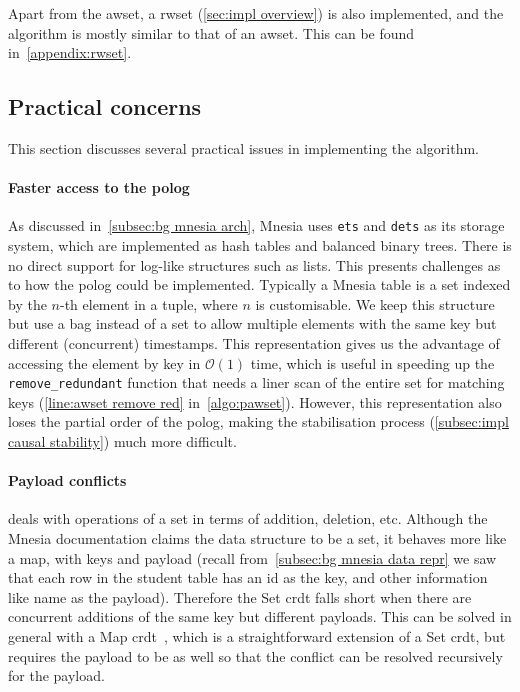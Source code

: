 Apart from the \acrlong{awset}, a \acrlong{rwset} (\cref{sec:impl overview}) 
is also implemented, and the 
algorithm is mostly similar to that of an \acrlong{awset}.
This can be found in~\cref{appendix:rwset}. 

\subsection{Practical concerns} \label{subsec:impl practical}

This section discusses several practical issues in implementing the algorithm.

\paragraph{Faster access to the \acrshort{polog}}

As discussed in~\cref{subsec:bg mnesia arch}, Mnesia uses \texttt{ets} and \texttt{dets}
as its storage system, which are implemented as hash tables and balanced binary trees.
There is no direct support for log-like structures such as lists. This
presents challenges as to how the \acrshort{polog} could be implemented. Typically
a Mnesia table is a set indexed by the \(n\)-th element in a tuple, where \(n\) 
is customisable. We keep this structure but use a bag instead of a set to allow
multiple elements with the same key but different (concurrent) timestamps. 
This representation gives us the advantage of accessing the element by key 
in \(\mathcal O(1)\) time, which is useful in speeding
up the \verb|remove_redundant| function that needs a liner scan of the entire set
for matching keys (\cref{line:awset remove red} in~\cref{algo:pawset}).
However, this representation also loses the partial order of the
\acrshort{polog}, making the stabilisation process (\cref{subsec:impl causal stability}) 
much more difficult. 


\paragraph{Payload conflicts}

 deals with operations of a set in terms of addition, deletion,
etc. Although the Mnesia documentation claims the data structure to be a set,
it behaves more like a map, with keys and payload 
(recall from~\cref{subsec:bg mnesia data repr} we saw that each row in the student 
table has an id as the key, and other information like name as the payload). 
Therefore the Set \acrshort{crdt}
falls short when there are concurrent additions of the same key but different
payloads. This can be solved in general with a Map \acrshort{crdt}~\cite{shapiro2011CRDT}, 
which is a straightforward extension of a Set \acrshort{crdt}, but requires the
payload to be  as well so that the conflict can be resolved
recursively for the payload.

